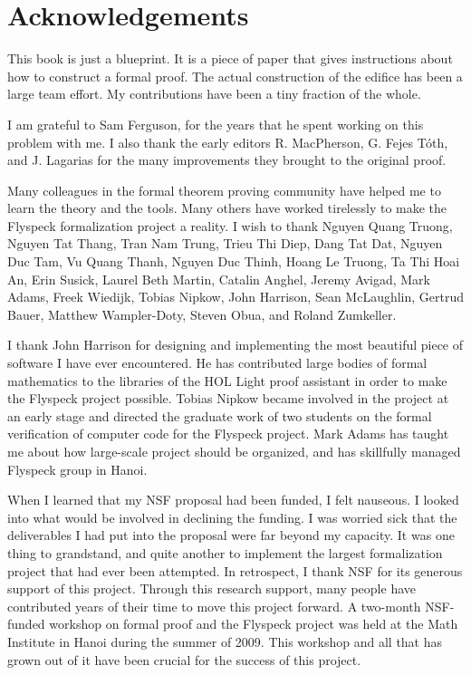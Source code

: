 

\section*{Acknowledgements}

This book is just a blueprint.  It is a piece of paper that gives instructions
about how to construct a formal proof.  The actual construction of the edifice
has been a large team effort.  My contributions have been a tiny fraction of the whole.

I am grateful to Sam Ferguson, for the years that
he spent working on this problem with me.  I also thank the early editors
R. MacPherson, G. Fejes T\'oth, and J. Lagarias for the many improvements
they brought to the original proof.

Many colleagues in the formal theorem proving community have helped me
to learn the theory and the tools.  Many others have worked tirelessly
 to make the Flyspeck formalization project a reality.  I wish to thank
Nguyen Quang Truong, %
Nguyen Tat Thang, %
Tran Nam Trung,
Trieu Thi Diep, Dang Tat Dat, Nguyen Duc Tam, Vu Quang Thanh, Nguyen
Duc Thinh, Hoang Le Truong, Ta Thi Hoai An, Erin Susick, Laurel Beth Martin, Catalin
Anghel, Jeremy Avigad, Mark Adams, Freek Wiedijk, Tobias Nipkow, John
Harrison, Sean McLaughlin, Gertrud Bauer, Matthew Wampler-Doty, Steven
Obua, and Roland Zumkeller. 

 I thank John Harrison for designing and implementing the most beautiful piece of
 software I have ever encountered.  He has contributed large bodies of formal mathematics to
the libraries of the HOL Light proof assistant in order to make the Flyspeck project
possible.   Tobias Nipkow became involved in the project at an early stage and
directed the graduate work of two students on the formal verification of computer
code for the Flyspeck project. Mark Adams has taught me about how
 large-scale project should be organized, and has skillfully managed 
  Flyspeck group in Hanoi.

  When I learned that my NSF proposal had been funded, I felt
  nauseous.  I looked into what would be involved in declining the
  funding.  I was  worried sick that the  deliverables I had put
  into the proposal were far beyond my capacity.  It was one thing to
  grandstand, and quite another to implement the largest
  formalization project that had ever been attempted.  In retrospect, I
  thank NSF for its generous support of this project.  Through this
  research support, many people have contributed years of their time to move this
  project forward.  A two-month NSF-funded workshop on formal proof
  and the Flyspeck project was held at the Math Institute in Hanoi during the summer of
  2009.  This workshop and all that has grown out of it have been crucial for
  the success of this project.

